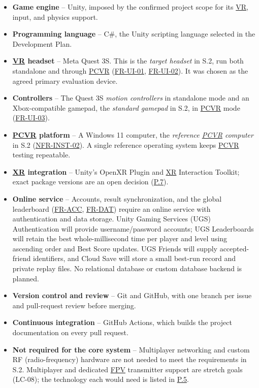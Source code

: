 \documentclass[12pt]{article}
\begin{document}
\begin{itemize}
\item \textbf{Game engine} -- Unity, imposed by the confirmed project scope
for its \hyperlink{glos:VR}{VR}, input, and physics support.
\item \textbf{Programming language} -- C\#, the Unity scripting language
selected in the Development Plan.
\item \textbf{\hyperlink{glos:VR}{VR} headset} -- Meta Quest 3S. This is the \emph{target headset}
in S.2, run both standalone and through \hyperlink{glos:PCVR}{PCVR}
(\hyperlink{req:FR-UI-01}{FR-UI-01}, \hyperlink{req:FR-UI-02}{FR-UI-02}). It
was chosen as the agreed primary evaluation device.
\item \textbf{Controllers} -- The Quest 3S \emph{motion controllers} in
standalone mode and an Xbox-compatible gamepad, the \emph{standard gamepad} in
S.2, in \hyperlink{glos:PCVR}{PCVR} mode (\hyperlink{req:FR-UI-03}{FR-UI-03}).
\item \textbf{\hyperlink{glos:PCVR}{PCVR} platform} -- A Windows 11 computer, the \emph{reference \hyperlink{glos:PCVR}{PCVR}
computer} in S.2 (\hyperlink{req:NFR-INST-02}{NFR-INST-02}). A single
reference operating system keeps \hyperlink{glos:PCVR}{PCVR} testing repeatable.
\item \hypertarget{gl:XR}{}\textbf{\hyperlink{glos:XR}{XR} integration} -- Unity's OpenXR Plugin and \hyperlink{glos:XR}{XR} Interaction
Toolkit; exact package versions are an open decision
(\hyperref[p7]{P.7}).
\item \textbf{Online service} -- Accounts, result synchronization, and the
global leaderboard (\hyperref[sec:s2-accounts]{FR-ACC},
\hyperref[sec:s2-leaderboard]{FR-DAT}) require an online service with
authentication and data storage. Unity Gaming Services (UGS) Authentication
will provide username/password accounts; UGS Leaderboards will retain the
best whole-millisecond time per player and level using ascending order and
Best Score updates. UGS Friends will supply accepted-friend identifiers, and
Cloud Save will store a small best-run record and private replay files.
No relational database or custom database backend is planned.
\item \textbf{Version control and review} -- Git and GitHub, with one branch
per issue and pull-request review before merging.
\item \textbf{Continuous integration} -- GitHub Actions, which builds the
project documentation on every pull request.
\item \textbf{Not required for the core system} -- Multiplayer networking and
custom RF (radio-frequency) hardware are not needed to meet the requirements
in S.2. Multiplayer and dedicated \hyperlink{glos:FPV}{FPV} transmitter support are stretch goals
(LC-08); the technology each would need is listed in \hyperref[p5]{P.5}.
\end{itemize}
\end{document}

